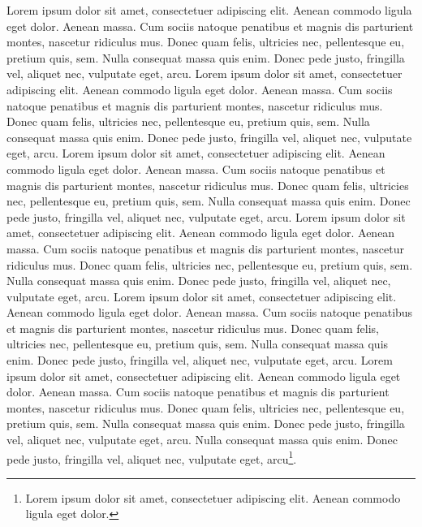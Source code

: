 Lorem ipsum dolor sit amet, consectetuer adipiscing elit. Aenean commodo ligula eget dolor. Aenean massa. Cum sociis natoque penatibus et magnis dis parturient montes, nascetur ridiculus mus. Donec quam felis, ultricies nec, pellentesque eu, pretium quis, sem. Nulla consequat massa quis enim. Donec pede justo, fringilla vel, aliquet nec, vulputate eget, arcu. Lorem ipsum dolor sit amet, consectetuer adipiscing elit. Aenean commodo ligula eget dolor. Aenean massa. Cum sociis natoque penatibus et magnis dis parturient montes, nascetur ridiculus mus. Donec quam felis, ultricies nec, pellentesque eu, pretium quis, sem. Nulla consequat massa quis enim. Donec pede justo, fringilla vel, aliquet nec, vulputate eget, arcu. Lorem ipsum dolor sit amet, consectetuer adipiscing elit. Aenean commodo ligula eget dolor. Aenean massa. Cum sociis natoque penatibus et magnis dis parturient montes, nascetur ridiculus mus. Donec quam felis, ultricies nec, pellentesque eu, pretium quis, sem. Nulla consequat massa quis enim. Donec pede justo, fringilla vel, aliquet nec, vulputate eget, arcu. Lorem ipsum dolor sit amet, consectetuer adipiscing elit. Aenean commodo ligula eget dolor. Aenean massa. Cum sociis natoque penatibus et magnis dis parturient montes, nascetur ridiculus mus. Donec quam felis, ultricies nec, pellentesque eu, pretium quis, sem. Nulla consequat massa quis enim. Donec pede justo, fringilla vel, aliquet nec, vulputate eget, arcu. Lorem ipsum dolor sit amet, consectetuer adipiscing elit. Aenean commodo ligula eget dolor. Aenean massa. Cum sociis natoque penatibus et magnis dis parturient montes, nascetur ridiculus mus. Donec quam felis, ultricies nec, pellentesque eu, pretium quis, sem. Nulla consequat massa quis enim. Donec pede justo, fringilla vel, aliquet nec, vulputate eget, arcu. Lorem ipsum dolor sit amet, consectetuer adipiscing elit. Aenean commodo ligula eget dolor. Aenean massa. Cum sociis natoque penatibus et magnis dis parturient montes, nascetur ridiculus mus. Donec quam felis, ultricies nec, pellentesque eu, pretium quis, sem. Nulla consequat massa quis enim. Donec pede justo, fringilla vel, aliquet nec, vulputate eget, arcu. Nulla consequat massa quis enim. Donec pede justo, fringilla vel, aliquet nec, vulputate eget, arcu\footnote{Lorem ipsum dolor sit amet, consectetuer adipiscing elit. Aenean commodo ligula eget dolor.}.

